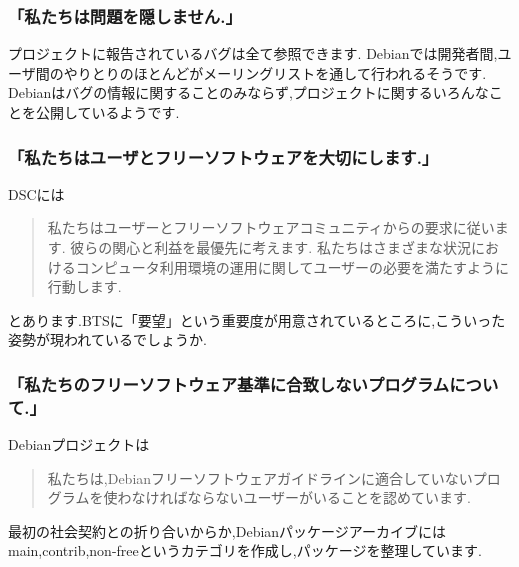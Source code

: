 \documentclass[mingoth,a4paper]{jsarticle}
\begin{document}
\subsubsection{「私たちは問題を隠しません.」}
プロジェクトに報告されているバグは全て参照できます.
Debianでは開発者間,ユーザ間のやりとりのほとんどがメーリングリストを通して行われるそうです.
Debianはバグの情報に関することのみならず,プロジェクトに関するいろんなことを公開しているようです.

\subsubsection{「私たちはユーザとフリーソフトウェアを大切にします.」}
DSCには
\begin{quote}
私たちはユーザーとフリーソフトウェアコミュニティからの要求に従います.
彼らの関心と利益を最優先に考えます.
私たちはさまざまな状況におけるコンピュータ利用環境の運用に関してユーザーの必要を満たすように行動します.
\end{quote}
とあります.BTSに「要望」という重要度が用意されているところに,こういった姿勢が現われているでしょうか.

\subsubsection{「私たちのフリーソフトウェア基準に合致しないプログラムについて.」}
Debianプロジェクトは
\begin{quote}
私たちは,Debianフリーソフトウェアガイドラインに適合していないプログラムを使わなければならないユーザーがいることを認めています.
\end{quote}
最初の社会契約との折り合いからか,Debianパッケージアーカイブにはmain,contrib,non-freeというカテゴリを作成し,パッケージを整理しています.
\end{document}
